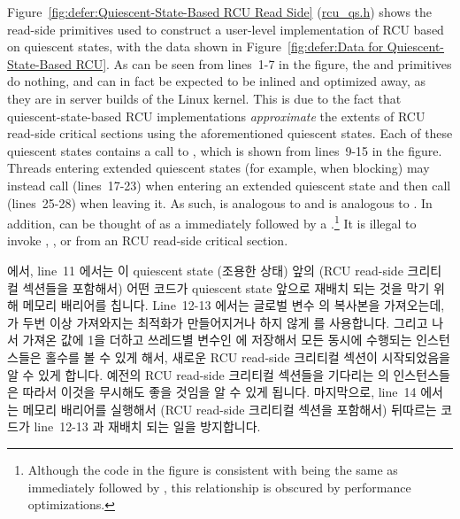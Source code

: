 Figure~\ref{fig:defer:Quiescent-State-Based RCU Read Side}
(\url{rcu_qs.h})
shows the read-side primitives used to construct a user-level
implementation of RCU based on quiescent states, with the data shown in
Figure~\ref{fig:defer:Data for Quiescent-State-Based RCU}.
As can be seen from lines~1-7 in the figure, the 
and  primitives do nothing, and can in fact
be expected to be inlined and optimized away, as they are in
server builds of the Linux kernel.
This is due to the fact that quiescent-state-based RCU implementations
\emph{approximate} the extents of RCU read-side critical sections
using the aforementioned quiescent states.
Each of these quiescent states contains a call to
, which is shown from lines~9-15 in the figure.
Threads entering extended quiescent states (for example, when blocking)
may instead call  (lines~17-23) when entering
an extended quiescent state and then call
 (lines~25-28) when leaving it.
As such,  is analogous to 
and  is analogous to .
In addition,  can be thought of as a
 immediately followed by a
.\footnote{
	Although the code in the figure is consistent with
	being the same as  immediately followed by
	, this relationship is obscured by
	performance optimizations.}
It is illegal to invoke , ,
or  from an RCU read-side critical section.
\fi

 에서, line~11 에서는 이 quiescent state (조용한
상태) 앞의 (RCU read-side 크리티컬 섹션들을 포함해서) 어떤 코드가 quiescent
state 앞으로 재배치 되는 것을 막기 위해 메모리 배리어를 칩니다.
Line~12-13 에서는 글로벌 변수  의 복사본을 가져오는데,
 가 두번 이상 가져와지는 최적화가 만들어지거나 하지 않게
 를 사용합니다. 그리고 나서 가져온 값에 1을 더하고 쓰레드별
변수인  에 저장해서 모든 동시에 수행되는
 인스턴스들은 홀수를 볼 수 있게 해서, 새로운 RCU read-side
크리티컬 섹션이 시작되었음을 알 수 있게 합니다.
예전의 RCU read-side 크리티컬 섹션들을 기다리는  의
인스턴스들은 따라서 이것을 무시해도 좋을 것임을 알 수 있게 됩니다.
마지막으로, line~14 에서는 메모리 배리어를 실행해서 (RCU read-side 크리티컬
섹션을 포함해서) 뒤따르는 코드가 line~12-13 과 재배치 되는 일을 방지합니다.
\iffalse

